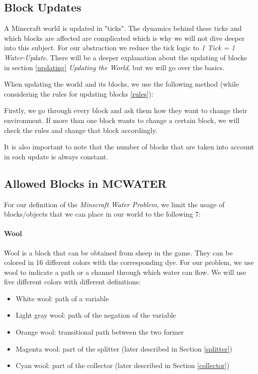 \subsection{Block Updates} \label{blockupdates}
\noindent A Minecraft world is updated in "ticks". The dynamics behind these ticks and which blocks are affected are complicated which is why we will not dive deeper into this subject. For our abstraction we reduce the tick logic to \textit{1 Tick = 1 Water-Update}. There will be a deeper explanation about the updating of blocks in section \ref{updating} \textit{Updating the World}, but we will go over the basics.


\noindent When updating the world and its blocks, we use the following method (while considering the rules for updating blocks \ref{rules}):

\noindent Firstly, we go through every block and ask them how they want to change their environment. If more than one block wants to change a certain block, we will check the rules and change that block accordingly. 

\noindent It is also important to note that the number of blocks that are taken into account in each update is always constant.

\pagebreak
\subsection{Allowed Blocks in MCWATER} \label{blocks}

\noindent For our definition of the \textit{Minecraft Water Problem}, we limit the usage of blocks/objects that we can place in our world to the following 7:
\paragraph{Wool\cite{minecraftfandom:wool}}
Wool is a block that can be obtained from sheep in the game.
They can be colored in 16 different colors with the corresponding dye.
For our problem, we use wool to indicate a path or a channel through which water can flow.
We will use five different colors with different definitions:
\begin{itemize}
    \item White wool: path of a variable
    \item Light gray wool: path of the negation of the variable
    \item Orange wool: transitional path between the two former
    \item Magenta wool: part of the splitter (later described in Section \ref{splitter})
    \item Cyan wool: part of the collector (later described in Section \ref{collector})
\end{itemize}

